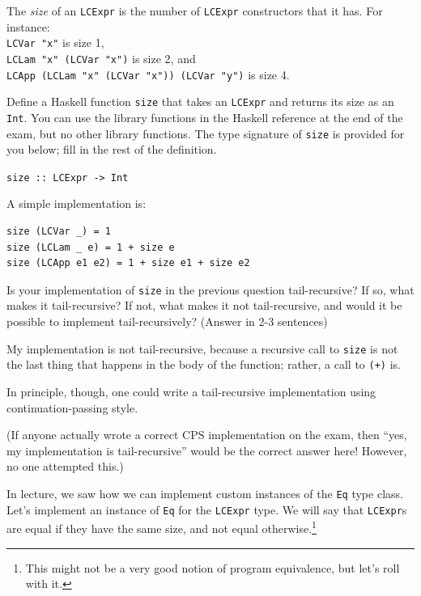 \documentclass[addpoints]{exam}
\begin{document}
\begin{questions}
\begin{solutionorbox}[1.25in]
\end{solutionorbox}

\question[6] The \emph{size} of an \verb|LCExpr| is the number of \verb|LCExpr| constructors that it has.  For instance:\\
\verb|LCVar "x"| is size 1,\\
\verb|LCLam "x" (LCVar "x")| is size 2, and \\
\verb|LCApp (LCLam "x" (LCVar "x")) (LCVar "y")| is size 4.

Define a Haskell function \verb|size| that takes an \verb|LCExpr| and returns its size as an \verb|Int|.  You can use the library functions in the Haskell reference at the end of the exam, but no other library functions. The type signature of \verb|size| is provided for you below; fill in the rest of the definition.

\verb|size :: LCExpr -> Int|
\begin{solutionorbox}[\stretch{1}]
A simple implementation is:
  
\begin{verbatim}
size (LCVar _) = 1
size (LCLam _ e) = 1 + size e
size (LCApp e1 e2) = 1 + size e1 + size e2
\end{verbatim}
\end{solutionorbox}

\newpage

\question[6] Is your implementation of \verb|size| in the previous question tail-recursive?  If so, what makes it tail-recursive?  If not, what makes it not tail-recursive, and would it be possible to implement tail-recursively? (Answer in 2-3 sentences)

\begin{solutionorbox}[2.5in]
My implementation is not tail-recursive, because a recursive call to \texttt{size} is not the last thing that happens in the body of the function; rather, a call to \texttt{(+)} is.

In principle, though, one could write a tail-recursive implementation using continuation-passing style.

(If anyone actually wrote a correct CPS implementation on the exam, then ``yes, my implementation is tail-recursive'' would be the correct answer here!  However, no one attempted this.)
\end{solutionorbox}

\question[5] In lecture, we saw how we can implement custom instances of the \texttt{Eq} type class.  Let's implement an instance of \texttt{Eq} for the \texttt{LCExpr} type.  We will say that \texttt{LCExpr}s are equal if they have the same size, and not equal otherwise.\footnote{This might not be a very good notion of program equivalence, but let's roll with it.}


\end{questions}
\end{document}
